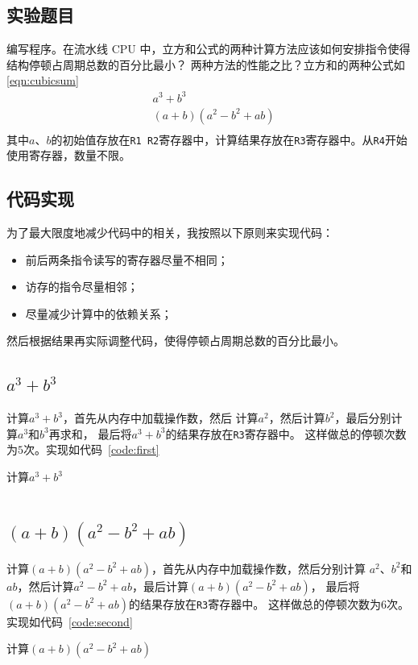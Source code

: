 \documentclass[a4paper,twoside]{article}
\begin{document}
\begin{spacing}{1.2}
\subsection{实验题目}

编写程序。在流水线 CPU 中，立方和公式的两种计算方法应该如何安排指令使得结构停顿占周期总数的百分比最小？
两种方法的性能之比？立方和的两种公式如\eqref{eqn:cubicsum}
\begin{equation}
	\label{eqn:cubicsum}
	\begin{aligned}
		& a^3+b^3 \\
		& (a+b)(a^2-b^2+ab) \\
	\end{aligned}
\end{equation}
其中$a$、$b$的初始值存放在\texttt{R1 R2}寄存器中，计算结果存放在\texttt{R3}寄存器中。从\texttt{R4}开始使用寄存器，数量不限。

\subsection{代码实现}

为了最大限度地减少代码中的相关，我按照以下原则来实现代码：
\begin{itemize}
	\item 前后两条指令读写的寄存器尽量不相同；
	\item 访存的指令尽量相邻；
	\item 尽量减少计算中的依赖关系；
\end{itemize}
然后根据结果再实际调整代码，使得停顿占周期总数的百分比最小。

\subsection{$a^3+b^3$}

计算$a^3+b^3$，首先从内存中加载操作数，然后
计算$a^2$，然后计算$b^2$，最后分别计算$a^3$和$b^3$再求和，
最后将$a^3+b^3$的结果存放在\texttt{R3}寄存器中。
这样做总的停顿次数为$5$次。实现如代码~\ref*{code:first}
\begin{listing}[htb]
	\caption{计算$a^3+b^3$}
	\label{code:first}
	\inputminted{nasm}{../code/good/mul.s}
\end{listing}


\subsection{$(a+b)(a^2-b^2+ab)$}

计算$(a+b)(a^2-b^2+ab)$，首先从内存中加载操作数，然后分别计算
$a^2$、$b^2$和$ab$，然后计算$a^2-b^2+ab$，最后计算$(a+b)(a^2-b^2+ab)$，
最后将$(a+b)(a^2-b^2+ab)$的结果存放在\texttt{R3}寄存器中。
这样做总的停顿次数为$6$次。实现如代码~\ref*{code:second}
\begin{listing}[htb]
	\caption{计算$(a+b)(a^2-b^2+ab)$}
	\label{code:second}
	\inputminted{nasm}{../code/good/mul2.s}
\end{listing}


\end{spacing}
\end{document}
